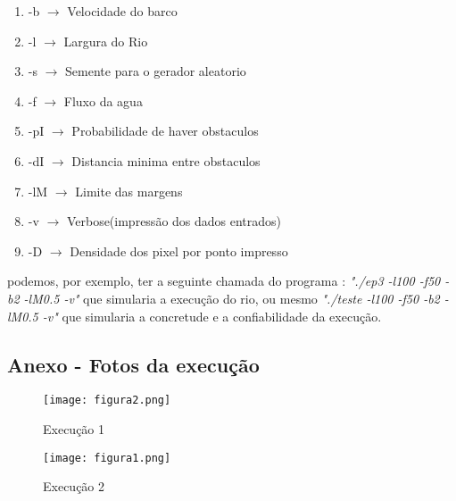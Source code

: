 \documentclass[a4paper,11pt]{article}
\begin{document}
\begin{enumerate}
\item[]{-b  $\rightarrow$ Velocidade do barco}
\item[]{-l  $\rightarrow$ Largura do Rio}
\item[]{-s  $\rightarrow$ Semente para o gerador aleatorio}
\item[]{-f  $\rightarrow$ Fluxo da agua}
\item[]{-pI $\rightarrow$ Probabilidade de haver obstaculos}
\item[]{-dI $\rightarrow$ Distancia minima entre obstaculos}
\item[]{-lM $\rightarrow$ Limite das margens}
\item[]{-v  $\rightarrow$ Verbose(impressão dos dados entrados)}
\item[]{-D  $\rightarrow$ Densidade dos pixel por ponto impresso}



\end{enumerate}

podemos, por exemplo, ter a seguinte chamada do programa : \textit{"./ep3 -l100 -f50 -b2 -lM0.5 -v"} que simularia a execu\c{c}ão do rio, ou mesmo \textit{"./teste -l100 -f50 -b2 -lM0.5 -v"} que simularia a concretude e a confiabilidade da execu\c{c}ão.

\newpage
\subsection{Anexo - Fotos da execu\c{c}ão}
\begin{figure}[htb]
\begin{center}
\texttt{[image: figura2.png]}
\caption{Execu\c{c}ão 1}

\end{center}
\end{figure}


\begin{figure}[htb]
\begin{center}
\texttt{[image: figura1.png]}
\caption{Execu\c{c}ão 2}
\end{center}
\end{figure}
\end{document}
